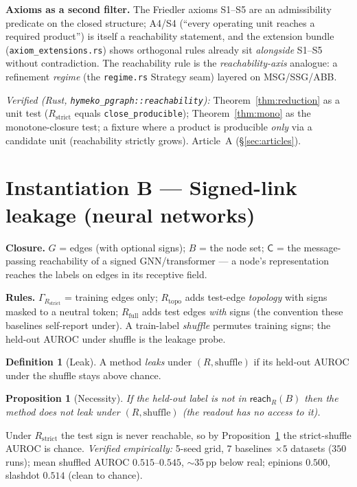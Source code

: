 \documentclass[11pt,a4paper]{article}
\theoremstyle{definition}
\newtheorem{definition}{Definition}
\theoremstyle{plain}
\newtheorem{proposition}{Proposition}
\theoremstyle{remark}
\newcommand{\Cl}{\mathsf{C}}
\newcommand{\Rstrict}{R_{\mathrm{strict}}}
\newcommand{\Rtopo}{R_{\mathrm{topo}}}
\newcommand{\Rfull}{R_{\mathrm{full}}}
\newcommand{\reach}{\mathsf{reach}}
\begin{document}
\textbf{Axioms as a second filter.} The Friedler axioms S1--S5 are an
admissibility predicate on the closed structure; A4/S4 (``every operating unit
reaches a required product'') is itself a reachability statement, and the
extension bundle (\texttt{axiom\_extensions.rs}) shows orthogonal rules already
sit \emph{alongside} S1--S5 without contradiction. The reachability rule is the
\emph{reachability-axis} analogue: a refinement \emph{regime} (the
\texttt{regime.rs} Strategy seam) layered on MSG/SSG/ABB.

\emph{Verified (Rust, \texttt{hymeko\_pgraph::reachability}):}
Theorem~\ref{thm:reduction} as a unit test ($\Rstrict$ equals
\texttt{close\_producible}); Theorem~\ref{thm:mono} as the monotone-closure test;
a fixture where a product is producible \emph{only} via a candidate unit
(reachability strictly grows). Article~A (\S\ref{sec:articles}).

\section{Instantiation B --- Signed-link leakage (neural networks)}
\label{sec:nn}

\textbf{Closure.} $G$ = edges (with optional signs); $B$ = the node set;
$\Cl$ = the message-passing reachability of a signed GNN/transformer --- a node's
representation reaches the labels on edges in its receptive field.

\textbf{Rules.} $\Gamma_{\Rstrict}$ = training edges only; $\Rtopo$ adds
test-edge \emph{topology} with signs masked to a neutral token; $\Rfull$ adds
test edges \emph{with} signs (the convention these baselines self-report under).
A train-label \emph{shuffle} permutes training signs; the held-out AUROC under
shuffle is the leakage probe.

\begin{definition}[Leak]
A method \emph{leaks} under $(R,\text{shuffle})$ if its held-out AUROC under the
shuffle stays above chance.
\end{definition}

\begin{proposition}[Necessity]
\label{prop:nec}
If the held-out label is not in $\reach_R(B)$ then the method does not leak under
$(R,\text{shuffle})$ (the readout has no access to it).
\end{proposition}
Under $\Rstrict$ the test sign is never reachable, so by
Proposition~\ref{prop:nec} the strict-shuffle AUROC is chance. \emph{Verified
empirically:} 5-seed grid, $7$ baselines $\times 5$ datasets ($350$ runs); mean
shuffled AUROC $0.515$--$0.545$, $\sim$35\,pp below real; epinions $0.500$,
slashdot $0.514$ (clean to chance).
\end{document}
